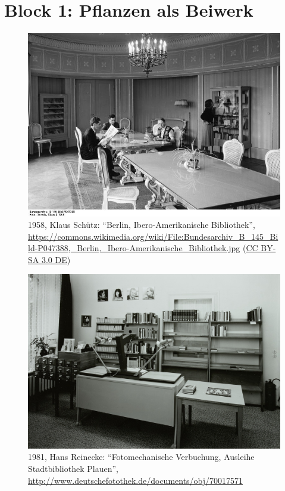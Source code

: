 \documentclass[a4paper,
fontsize=11pt,
oneside,
numbers=noperiodatend,
parskip=half-,
bibliography=totoc,
final
]{scrartcl}
\begin{document}
\hypertarget{block-1-pflanzen-als-beiwerk}{%
\section{Block 1: Pflanzen als
Beiwerk}\label{block-1-pflanzen-als-beiwerk}}

\begin{figure}
\centering
\includegraphics[width=0.7\columnwidth]{img/bundesarchiv-B145-Bild-P047388.jpg}
\caption{1958, Klaus Schütz: \enquote{Berlin, Ibero-Amerikanische
Bibliothek},
\url{https://commons.wikimedia.org/wiki/File:Bundesarchiv_B_145_Bild-P047388,_Berlin,_Ibero-Amerikanische_Bibliothek.jpg}
(\href{https://creativecommons.org/licenses/by-sa/3.0/de/legalcode}{CC
BY-SA 3.0 DE})}
\end{figure}

\begin{figure}
\centering
\includegraphics[width=0.7\columnwidth]{img/df-0196029.jpg}
\caption{1981, Hans Reinecke: \enquote{Fotomechanische Verbuchung,
Ausleihe Stadtbibliothek Plauen},
\url{http://www.deutschefotothek.de/documents/obj/70017571}}
\end{figure}
\end{document}
